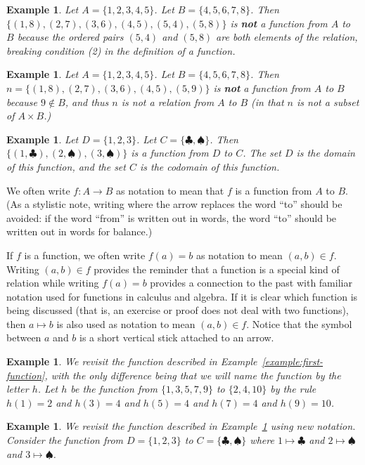 \documentclass{book}
\newcounter{ekcounter}%
\theoremstyle{ekimcustom}
\newtheorem{example}[ekcounter]{Example}
\begin{document}
\begin{example}
Let $A = \{1,2,3,4,5\}$. Let $B = \{4,5,6,7,8\}$. Then $\{(1,8),(2,7),(3,6),(4,5),(5,4),(5,8)\}$ is {\bf not} a function from $A$ to $B$ because the ordered pairs $(5,4)$ and $(5,8)$ are both elements of the relation, breaking condition (2) in the definition of a function.
\end{example}
\begin{example}
Let $A = \{1,2,3,4,5\}$. Let $B = \{4,5,6,7,8\}$. Then $n=\{(1,8),(2,7),(3,6),(4,5),(5,9)\}$ is {\bf not} a function from $A$ to $B$ because $9 \not \in B$, and thus $n$ is not a relation from $A$ to $B$ (in that $n$ is not a subset of $A \times B$.)
\end{example}
\begin{example}\label{example:function-with-suits}
Let $D = \{1,2,3\}$. Let $C = \{\clubsuit,\spadesuit\}$. Then $\{(1,\clubsuit),(2,\spadesuit),(3,\spadesuit)\}$ is a function from $D$ to $C$. The set $D$ is the domain of this function, and the set $C$ is the codomain of this function.
\end{example}

We often write $f : A \to B$ as notation to mean that $f$ is a function from $A$ to $B$. (As a stylistic note, writing  where the arrow replaces the word ``to'' should be avoided: if the word ``from'' is written out in words, the word ``to'' should be written out in words for balance.)

If $f$ is a function, we often write $f(a)=b$ as notation to mean $(a,b) \in f$. Writing $(a,b) \in f$ provides the reminder that a function is a special kind of relation while writing $f(a)=b$ provides a connection to the past with familiar notation used for functions in calculus and algebra. If it is clear which function is being discussed (that is, an exercise or proof does not deal with two functions), then $a \mapsto b$ is also used as notation to mean $(a,b) \in f$. Notice that the symbol between $a$ and $b$ is a short vertical stick attached to an arrow.
\begin{example}
We revisit the function described in Example~\ref{example:first-function}, with the only difference being that we will name the function by the letter $h$. Let $h$ be the function from $\{1,3,5,7,9\}$ to $\{2,4,10\}$ by the rule $h(1)=2$ and $h(3)=4$ and $h(5)=4$ and $h(7)=4$ and $h(9)=10$.
\end{example}
\begin{example}
We revisit the function described in Example~\ref{example:function-with-suits} using new notation. Consider the function from $D = \{1,2,3\}$ to $C = \{\clubsuit,\spadesuit\}$ where $1 \mapsto \clubsuit$ and $2 \mapsto \spadesuit$ and $3 \mapsto \spadesuit$.
\end{example}
\end{document}
